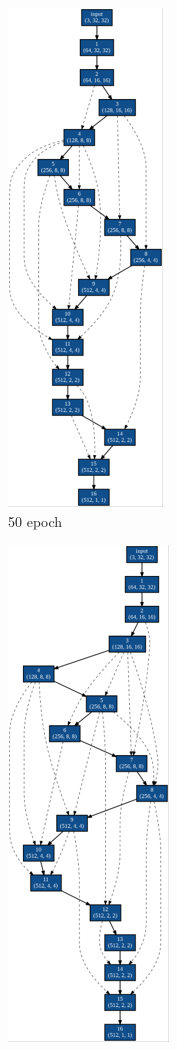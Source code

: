 \begin{figure}[tb]
 \begin{minipage}{0.3\hsize}
 	\begin{center}
 		\includegraphics[clip,scale=0.8]{./fig/04.exp/a50.png}\\
 		50 epoch
 	\end{center}
 \end{minipage}
 \begin{minipage}{0.3\hsize}
 	\begin{center}
    \includegraphics[clip,scale=0.8]{./fig/04.exp/a100.png}\\

\end{center}
\end{minipage}
\end{figure}
